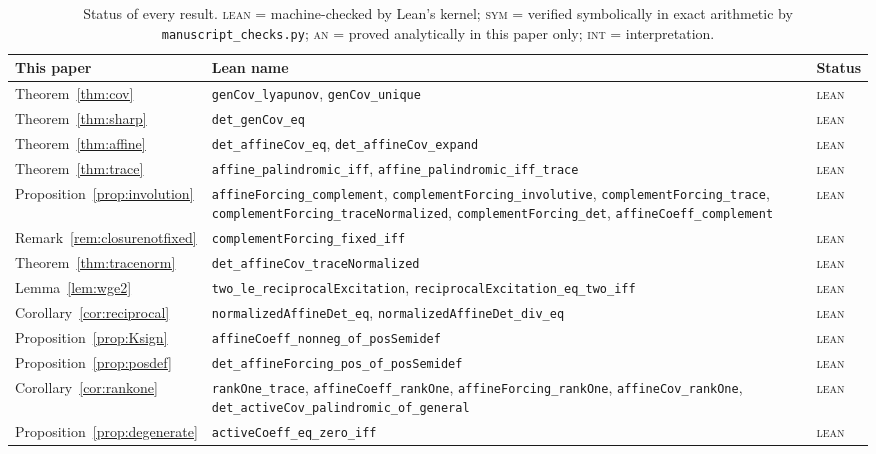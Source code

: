\documentclass[11pt]{article}
\theoremstyle{plain}
\theoremstyle{definition}
\theoremstyle{remark}
\begin{document}
\begin{table}[!tbp]
\centering
\caption{Status of every result. \textsc{lean} = machine-checked by Lean's kernel;
\textsc{sym} = verified symbolically in exact arithmetic by \texttt{manuscript\_checks.py};
\textsc{an} = proved analytically in this paper only; \textsc{int} = interpretation.}
\label{tab:lean}
\small
\begin{tabular}{@{}l >{\raggedright\arraybackslash}p{} l@{}}
\toprule
This paper & Lean name & Status\\
\midrule
Theorem~\ref{thm:cov} & \texttt{genCov\_lyapunov}, \texttt{genCov\_unique} & \textsc{lean}\\
Theorem~\ref{thm:sharp} & \texttt{det\_genCov\_eq} & \textsc{lean}\\
Theorem~\ref{thm:affine} & \texttt{det\_affineCov\_eq}, \texttt{det\_affineCov\_expand} & \textsc{lean}\\
Theorem~\ref{thm:trace} & \texttt{affine\_palindromic\_iff}, \texttt{affine\_palindromic\_iff\_trace} & \textsc{lean}\\
Proposition~\ref{prop:involution} & \texttt{affineForcing\_complement}, \texttt{complementForcing\_involutive}, \texttt{complementForcing\_trace}, \texttt{complementForcing\_traceNormalized}, \texttt{complementForcing\_det}, \texttt{affineCoeff\_complement} & \textsc{lean}\\
Remark~\ref{rem:closurenotfixed} & \texttt{complementForcing\_fixed\_iff} & \textsc{lean}\\
Theorem~\ref{thm:tracenorm} & \texttt{det\_affineCov\_traceNormalized} & \textsc{lean}\\
Lemma~\ref{lem:wge2} & \texttt{two\_le\_reciprocalExcitation}, \texttt{reciprocalExcitation\_eq\_two\_iff} & \textsc{lean}\\
Corollary~\ref{cor:reciprocal} & \texttt{normalizedAffineDet\_eq}, \texttt{normalizedAffineDet\_div\_eq} & \textsc{lean}\\
Proposition~\ref{prop:Ksign} & \texttt{affineCoeff\_nonneg\_of\_posSemidef} & \textsc{lean}\\
Proposition~\ref{prop:posdef} & \texttt{det\_affineForcing\_pos\_of\_posSemidef} & \textsc{lean}\\
Corollary~\ref{cor:rankone} & \texttt{rankOne\_trace}, \texttt{affineCoeff\_rankOne}, \texttt{affineForcing\_rankOne}, \texttt{affineCov\_rankOne}, \texttt{det\_activeCov\_palindromic\_of\_general} & \textsc{lean}\\
Proposition~\ref{prop:degenerate} & \texttt{activeCoeff\_eq\_zero\_iff} & \textsc{lean}\\

\end{tabular}
\end{table}
\end{document}
